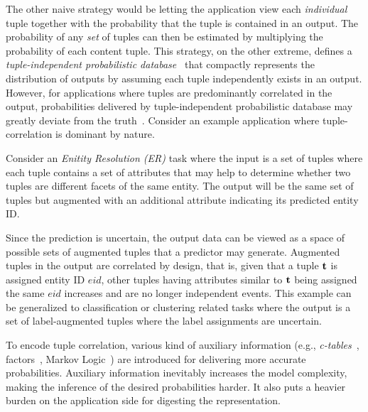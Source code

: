 The other naive strategy would be letting the application view each \emph{individual} tuple together with the probability that the tuple is contained in an output.
The probability of any \emph{set} of tuples can then be estimated by multiplying the probability of each content tuple. 
This strategy, on the other extreme, defines a \emph{tuple-independent probabilistic database}~\cite{suciu2009probabilistic} that compactly represents the distribution of outputs by assuming each tuple independently exists in an output.
However, for applications where tuples are predominantly correlated in the output, probabilities delivered by tuple-independent probabilistic database may greatly deviate from the truth~\cite{Gupta:2006:CPD:1182635.1164210}.
Consider an example application where tuple-correlation is dominant by nature.
\begin{example}
Consider an \emph{Enitity Resolution (ER)} task where the input is a set of tuples where each tuple contains a set of attributes that may help to determine whether two tuples are different facets of the same entity.
The output will be the same set of tuples but augmented with an additional attribute indicating its predicted entity ID.
\end{example}
Since the prediction is uncertain, the output data can be viewed as a space of possible sets of augmented tuples that a predictor may generate.
Augmented tuples in the output are correlated by design, that is, given that a tuple $\mathbf{t}$ is assigned entity ID $eid$, other tuples having attributes similar to $\mathbf{t}$ being assigned the same $eid$ increases and are no longer independent events.
This example can be generalized to classification or clustering related tasks where the output is a set of label-augmented tuples where the label assignments are uncertain.

To encode tuple correlation, various kind of auxiliary information  (e.g., \emph{c-tables}~\cite{suciu2009probabilistic}, factors~\cite{friedman1999learning,sen2007representing, sen2009prdb}, Markov Logic~\cite{jha2012probabilistic}) are introduced for delivering more accurate probabilities. 
Auxiliary information inevitably increases the model complexity, making the inference of the desired probabilities harder.
It also puts a heavier burden on the application side for digesting the representation.

